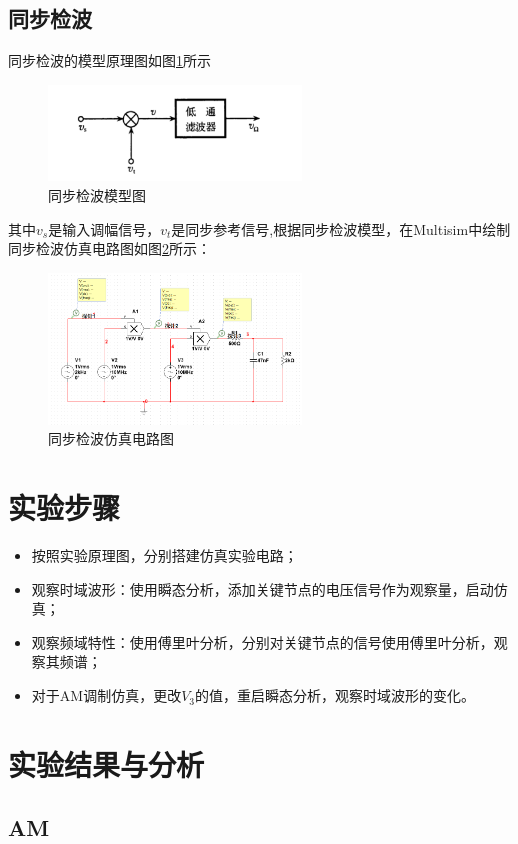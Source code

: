\documentclass[UTF8]{ctexart}
\begin{document}
\subsection{同步检波}
同步检波的模型原理图如图\ref{img:6}所示
\begin{figure}[htbp]
    \centering
    \includegraphics[width=0.6\textwidth]{6.png}
    \caption{同步检波模型图}
    \label{img:6}
\end{figure}
其中$v_s$是输入调幅信号，$v_t$是同步参考信号,根据同步检波模型，在Multisim中绘制同步检波仿真电路图如图\ref{img:7}所示：
\begin{figure}[htbp]
    \centering
    \includegraphics[width=0.6\textwidth]{7.png}
    \caption{同步检波仿真电路图}
    \label{img:7}
\end{figure}
\section{实验步骤}
\begin{itemize}
    \item 按照实验原理图，分别搭建仿真实验电路；
    \item 观察时域波形：使用瞬态分析，添加关键节点的电压信号作为观察量，启动仿真；
    \item 观察频域特性：使用傅里叶分析，分别对关键节点的信号使用傅里叶分析，观察其频谱；
    \item 对于AM调制仿真，更改$V_3$的值，重启瞬态分析，观察时域波形的变化。
\end{itemize}
\section{实验结果与分析}
\subsection{AM}
\end{document}
